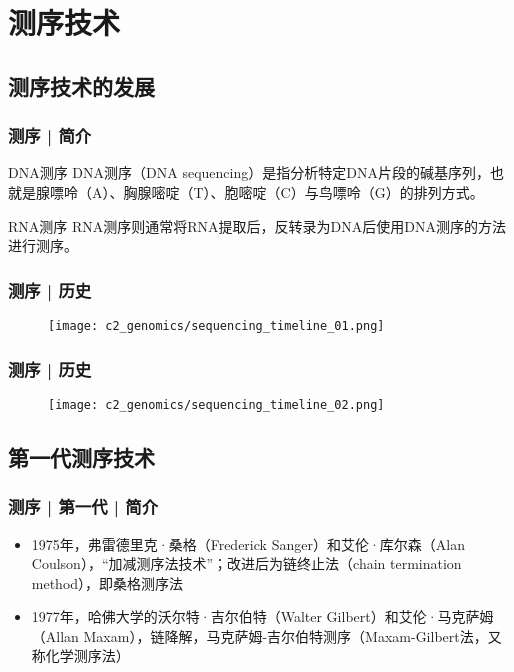 \section{测序技术}

\subsection{测序技术的发展}
\begin{frame}
  \frametitle{测序 | 简介}
  \begin{block}{DNA测序}
DNA测序（DNA sequencing）是指分析特定DNA片段的碱基序列，也就是腺嘌呤（A）、胸腺嘧啶（T）、胞嘧啶（C）与鸟嘌呤（G）的排列方式。
  \end{block}
  \pause
  \begin{block}{RNA测序}
RNA测序则通常将RNA提取后，反转录为DNA后使用DNA测序的方法进行测序。
  \end{block}
\end{frame}

\begin{frame}
  \frametitle{测序 | 历史}
  \begin{figure}
    \centering
    \texttt{[image: c2\_genomics/sequencing\_timeline\_01.png]}
  \end{figure}
\end{frame}

\begin{frame}
  \frametitle{测序 | 历史}
  \begin{figure}
    \centering
    \texttt{[image: c2\_genomics/sequencing\_timeline\_02.png]}
  \end{figure}
\end{frame}

\subsection{第一代测序技术}
\begin{frame}
  \frametitle{测序 | 第一代 | 简介}
   \begin{itemize}
     \item 1975年，弗雷德里克·桑格（Frederick Sanger）和艾伦·库尔森（Alan Coulson），“加减测序法技术”；改进后为链终止法（chain termination method），即桑格测序法
     \item 1977年，哈佛大学的沃尔特·吉尔伯特（Walter Gilbert）和艾伦·马克萨姆（Allan Maxam），链降解，马克萨姆-吉尔伯特测序（Maxam-Gilbert法，又称化学测序法）
   \end{itemize}
\end{frame}

